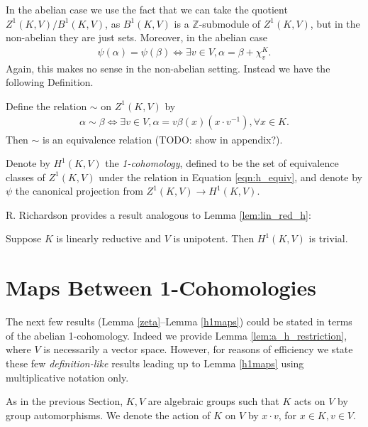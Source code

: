 In the abelian case we use the fact that we can take the quotient $Z^1(K, V)/B^1(K, V)$, as $B^1(K, V)$ is a $\mathbb{Z}$-submodule of $Z^1(K, V)$, but in the non-abelian they are just sets. Moreover, in the abelian case
\begin{align*}
	\psi(\alpha) = \psi(\beta) \Leftrightarrow \exists v \in V, \alpha = \beta + \chi^K_v.
\end{align*}
Again, this makes no sense in the non-abelian setting. Instead we have the following Definition.

\begin{definition} Define the relation $\sim$ on $Z^1(K, V)$ by
	\begin{align}
		\alpha \sim \beta \Leftrightarrow \exists v \in V, \alpha = v\beta(x)(x \cdot v^{-1}), \forall x \in K.
		\label{eqn:h_equiv}
	\end{align}
Then $\sim$ is an equivalence relation (TODO: show in appendix?).

Denote by $H^1(K, V)$ the \emph{1-cohomology}, defined to be the set of equivalence classes of $Z^1(K, V)$ under the relation in Equation \ref{eqn:h_equiv}, and denote by $\psi$ the canonical projection from $Z^1(K, V) \rightarrow H^1(K, V)$.
\end{definition}

R. Richardson \cite[Lemma 6.2.6]{richardson1982orbits} provides a result analogous to Lemma \ref{lem:lin_red_h}:
\begin{lemma}
  Suppose $K$ is linearly reductive and $V$ is unipotent. Then $H^1(K, V)$ is trivial.
  \label{lem:nonab_lin_red}
\end{lemma}

\section{Maps Between 1-Cohomologies}

The next few results (Lemma \ref{zeta}--Lemma \ref{h1maps}) could be stated in terms of the abelian 1-cohomology. Indeed we provide Lemma \ref{lem:a_h_restriction}, where $V$ is necessarily a vector space. However, for reasons of efficiency we state these few \emph{definition-like} results leading up to Lemma \ref{h1maps} using multiplicative notation only.

As in the previous Section, $K, V$ are algebraic groups such that $K$ acts on $V$ by group automorphisms. We denote the action of $K$ on $V$ by $x \cdot v$, for $x \in K, v \in V$.

